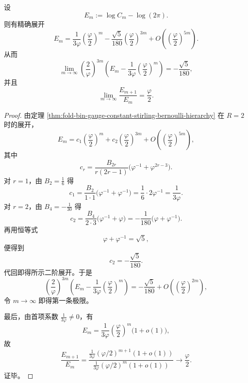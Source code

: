 \begin{corollary}\label{cor:xi-logcm-second-bernoulli-coefficient-ratio}
设
\[
E_m:=\log C_m-\log(2\pi).
\]
则有精确展开
\[
E_m
=
\frac{1}{3\varphi}\left(\frac{\varphi}{2}\right)^m
-\frac{\sqrt5}{180}\left(\frac{\varphi}{2}\right)^{3m}
+O\!\left(\left(\frac{\varphi}{2}\right)^{5m}\right).
\]
从而
\[
\lim_{m\to\infty}
\left(\frac{2}{\varphi}\right)^{3m}
\left(
E_m-\frac{1}{3\varphi}\left(\frac{\varphi}{2}\right)^m
\right)
=
-\frac{\sqrt5}{180},
\]
并且
\[
\lim_{m\to\infty}\frac{E_{m+1}}{E_m}=\frac{\varphi}{2}.
\]
\end{corollary}
\begin{proof}
由定理 \ref{thm:fold-bin-gauge-constant-stirling-bernoulli-hierarchy} 在 \(R=2\) 时的展开，
\[
E_m=c_1\left(\frac{\varphi}{2}\right)^m+c_2\left(\frac{\varphi}{2}\right)^{3m}
+O\!\left(\left(\frac{\varphi}{2}\right)^{5m}\right),
\]
其中
\[
c_r=\frac{B_{2r}}{r(2r-1)}\bigl(\varphi^{-1}+\varphi^{2r-3}\bigr).
\]
对 \(r=1\)，由 \(B_2=\frac16\) 得
\[
c_1=\frac{B_2}{1\cdot 1}\bigl(\varphi^{-1}+\varphi^{-1}\bigr)
=
\frac16\cdot 2\varphi^{-1}
=
\frac{1}{3\varphi}.
\]
对 \(r=2\)，由 \(B_4=-\frac1{30}\) 得
\[
c_2=\frac{B_4}{2\cdot 3}\bigl(\varphi^{-1}+\varphi\bigr)
=
-\frac1{180}\bigl(\varphi+\varphi^{-1}\bigr).
\]
再用恒等式
\[
\varphi+\varphi^{-1}=\sqrt5,
\]
便得到
\[
c_2=-\frac{\sqrt5}{180}.
\]
代回即得所示二阶展开。于是
\[
\left(\frac{2}{\varphi}\right)^{3m}
\left(
E_m-\frac{1}{3\varphi}\left(\frac{\varphi}{2}\right)^m
\right)
=
-\frac{\sqrt5}{180}
+O\!\left(\left(\frac{\varphi}{2}\right)^{2m}\right),
\]
令 \(m\to\infty\) 即得第一条极限。

最后，由首项系数 \(\frac{1}{3\varphi}\neq 0\)，有
\[
E_m=\frac{1}{3\varphi}\left(\frac{\varphi}{2}\right)^m\bigl(1+o(1)\bigr),
\]
故
\[
\frac{E_{m+1}}{E_m}
=
\frac{\frac{1}{3\varphi}(\varphi/2)^{m+1}(1+o(1))}
{\frac{1}{3\varphi}(\varphi/2)^m(1+o(1))}
\longrightarrow
\frac{\varphi}{2}.
\]
证毕。
\end{proof}
